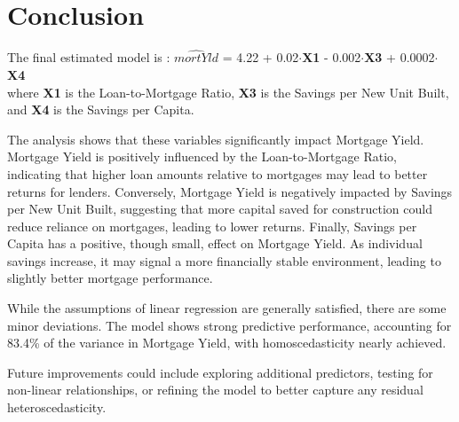 \documentclass[
  12pt,
]{article}
\begin{document}
\section{Conclusion}\label{conclusion}

The final estimated model is : \(\hat{mortYld}\) = 4.22 +
0.02\(\cdot\)\textbf{X1} - 0.002\(\cdot\)\textbf{X3} +
0.0002\(\cdot\)\textbf{X4}\\
where \textbf{X1} is the Loan-to-Mortgage Ratio, \textbf{X3} is the
Savings per New Unit Built, and \textbf{X4} is the Savings per Capita.

The analysis shows that these variables significantly impact Mortgage
Yield. Mortgage Yield is positively influenced by the Loan-to-Mortgage
Ratio, indicating that higher loan amounts relative to mortgages may
lead to better returns for lenders. Conversely, Mortgage Yield is
negatively impacted by Savings per New Unit Built, suggesting that more
capital saved for construction could reduce reliance on mortgages,
leading to lower returns. Finally, Savings per Capita has a positive,
though small, effect on Mortgage Yield. As individual savings increase,
it may signal a more financially stable environment, leading to slightly
better mortgage performance.

While the assumptions of linear regression are generally satisfied,
there are some minor deviations. The model shows strong predictive
performance, accounting for 83.4\% of the variance in Mortgage Yield,
with homoscedasticity nearly achieved.

Future improvements could include exploring additional predictors,
testing for non-linear relationships, or refining the model to better
capture any residual heteroscedasticity.
\end{document}
